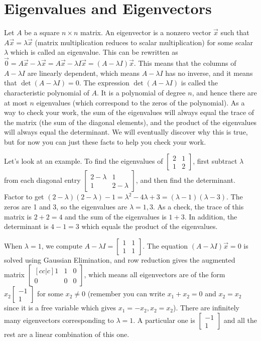 \documentclass[10pt]{article}
\begin{document}
\section{Eigenvalues and Eigenvectors}
Let {$A$} be a square {$n\times n$} matrix. An eigenvector is a nonzero vector {$\vec x$} such that {$A\vec x =\lambda \vec x$} (matrix multiplication reduces to scalar multiplication) for some scalar {$\lambda$} which is called an eigenvalue.  This can be rewritten as {$\vec 0 = A\vec x-\lambda \vec x = A\vec x-\lambda I \vec x  = (A-\lambda I)\vec x$}. This means that the columns of {$A-\lambda I$} are linearly dependent, which means $A-\lambda I$ has no inverse, and it means that {$\det(A-\lambda I)=0$}. The expression {$\det(A-\lambda I)$} is called the characteristic polynomial of {$A$}. It is a polynomial of degree {$n$}, and hence there are at most {$n$} eigenvalues (which correspond to the zeros of the polynomial). As a way to check your work, the sum of the eigenvalues will always equal the trace of the matrix (the sum of the diagonal elements), and the product of the eigenvalues will always equal the determinant. We will eventually discover why this is true, but for now you can just these facts to help you check your work.

Let's look at an example. To find the eigenvalues of {$\begin{bmatrix} 2&1\\1&2\end{bmatrix} $}, first subtract $\lambda$ from each diagonal entry {$\begin{bmatrix} 2-\lambda&1\\1&2-\lambda\end{bmatrix} $}, and then find the determinant. Factor to get {$(2-\lambda)(2-\lambda)-1 = \lambda^2-4\lambda+3=(\lambda-1)(\lambda-3)$}. The zeros are 1 and 3, so the eigenvalues are {$\lambda=1,3$}. As a check, the trace of this matrix is $2+2=4$ and the sum of the eigenvalues is $1+3$. In addition, the determinant is $4-1=3$ which equals the product of the eigenvalues.  

When {$\lambda=1$}, we compute {$A-\lambda I =\begin{bmatrix} 1&1\\1&1\end{bmatrix} $}. The equation  {$(A-\lambda I )\vec x=0$} is solved using Gaussian Elimination, and row reduction gives the augmented matrix {$\begin{bmatrix}[cc|c] 1&1&0\\0&0&0\end{bmatrix} $}, which means all eigenvectors are of the form {$x_2\begin{bmatrix} -1\\1\end{bmatrix} $} for some {$x_2\neq 0$} (remember you can write $x_1+x_2=0$ and $x_2=x_2$ since it is a free variable which gives $x_1=-x_2, x_2=x_2$). There are infinitely many eigenvectors corresponding to $\lambda=1$. A particular one is  $\begin{bmatrix} -1\\1\end{bmatrix} $ and all the rest are a linear combination of this one. 
\end{document}
